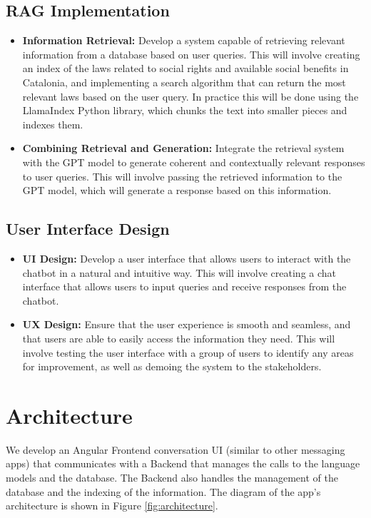 \documentclass[a4paper,12pt,twoside]{ThesisStyle}
\begin{document}
\section{RAG Implementation}
\label{sec:rag-implementation}

\begin{itemize}
\item \textbf{Information Retrieval:} Develop a system capable of retrieving relevant information from a database based on user queries. This will involve creating an index of the laws related to social rights and available social benefits in Catalonia, and implementing a search algorithm that can return the most relevant laws based on the user query. In practice this will be done using the LlamaIndex Python library, which chunks the text into smaller pieces and indexes them.
  \item \textbf{Combining Retrieval and Generation:} Integrate the retrieval system with the GPT model to generate coherent and contextually relevant responses to user queries. This will involve passing the retrieved information to the GPT model, which will generate a response based on this information.
\end{itemize}

\section{User Interface Design}
\label{sec:ui-design}

\begin{itemize}
  \item \textbf{UI Design:} Develop a user interface that allows users to interact with the chatbot in a natural and intuitive way. This will involve creating a chat interface that allows users to input queries and receive responses from the chatbot.
  \item \textbf{UX Design:} Ensure that the user experience is smooth and seamless, and that users are able to easily access the information they need. This will involve testing the user interface with a group of users to identify any areas for improvement, as well as demoing the system to the stakeholders.
\end{itemize}


\chapter{Architecture}
\label{cap:architecture}

We develop an Angular Frontend conversation UI (similar to other messaging apps) that communicates with a Backend that manages the calls to the language models and the database. The Backend also handles the management of the database and the indexing of the information. The diagram of the app's architecture is shown in Figure \ref{fig:architecture}.
\end{document}
